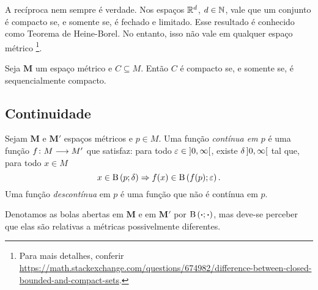 A recíproca nem sempre é verdade. Nos espaços $\mathbb{R}^d$, $d \in \mathbb{N}$, vale que um conjunto é compacto se, e somente se, é fechado e limitado. Esse resultado é conhecido como Teorema de Heine-Borel. No entanto, isso não vale em qualquer espaço métrico%
	\footnote{
		Para mais detalhes, conferir \url{https://math.stackexchange.com/questions/674982/difference-between-closed-bounded-and-compact-sets}.
	}.

\begin{exercise}
Seja $\bm M$ um espaço métrico e $C \subseteq M$. Então $C$ é compacto se, e somente se, é sequencialmente compacto.
\end{exercise}

\subsection{Continuidade}

\begin{definition}
Sejam $\bm M$ e $\bm M'$ espaços métricos e $p \in M$. Uma função \emph{contínua em $p$} é uma função $f\colon \allowbreak M \longrightarrow M'$ que satisfaz: para todo $\varepsilon \in \left]0,\allowbreak \infty\right[$, existe $\delta \left]0,\allowbreak \infty\right[$ tal que, para todo $x \in M$
	\begin{equation*}
	x \in \mathrm{B}\left(p; \delta\right) \Rightarrow f(x) \in \mathrm{B}\left(f(p); \varepsilon\right).
	\end{equation*}
Uma função \emph{descontínua} em $p$ é uma função que não é contínua em $p$.
\end{definition}

Denotamos as bolas abertas em $\bm M$ e em $\bm M'$ por $\mathrm{B}\left(\bm{\cdot}; \bm{\cdot}\right)$, mas deve-se perceber que elas são relativas a métricas possivelmente diferentes.


